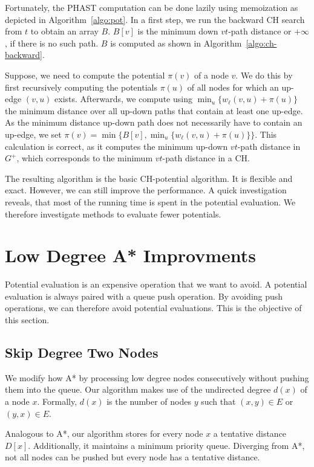 \documentclass[letterpaper]{article} %
\begin{document}
Fortunately, the PHAST computation can be done lazily using memoization as depicted in Algorithm~\ref{algo:pot}.
In a first step, we run the backward CH search from $t$ to obtain an array $B$.
$B[v]$ is the minimum down $vt$-path distance or $+\infty$, if there is no such path.
$B$ is computed as shown in Algorithm~\ref{algo:ch-backward}.

Suppose, we need to compute the potential $\pi(v)$ of a node $v$.
We do this by first recursively computing the potentials $\pi(u)$ of all nodes for which an up-edge $(v,u)$ exists.
Afterwards, we compute using $\min_u\{w_\ell(v,u) + \pi(u)\}$ the minimum distance over all up-down paths that contain at least one up-edge.
As the minimum distance up-down path does not necessarily have to contain an up-edge, we set $\pi(v) = \min \{ B[v], \min_u\{w_\ell(v,u) + \pi(u)\} \}$.
This calculation is correct, as it computes the minimum up-down $vt$-path distance in $G^+$, which corresponds to the minimum $vt$-path distance in a CH.

The resulting algorithm is the basic CH-potential algorithm.
It is flexible and exact.
However, we can still improve the performance.
A quick investigation reveals, that most of the running time is spent in the potential evaluation.
We therefore investigate methods to evaluate fewer potentials.

\section{Low Degree A* Improvments}

\label{sec:low-deg-improvment}

Potential evaluation is an expensive operation that we want to avoid.
A potential evaluation is always paired with a queue push operation.
By avoiding push operations, we can therefore avoid potential evaluations.
This is the objective of this section.

\subsection{Skip Degree Two Nodes}

We modify how A* by processing low degree nodes consecutively without pushing them into the queue.
Our algorithm makes use of the undirected degree $d(x)$ of a node $x$.
Formally, $d(x)$ is the number of nodes $y$ such that $(x,y)\in E$ or $(y,x)\in E$.

Analogous to A*, our algorithm stores for every node $x$ a tentative distance $D[x]$.
Additionally, it maintains a minimum priority queue.
Diverging from A*, not all nodes can be pushed but every node has a tentative distance.
\end{document}
